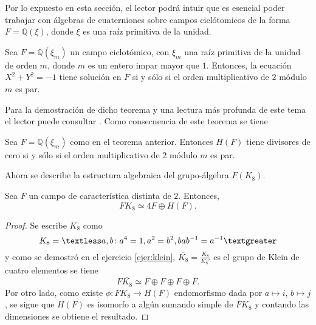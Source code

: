 Por lo expuesto en esta sección, el lector podrá intuir que es esencial poder trabajar con álgebras de cuaterniones sobre campos ciclótomicos de la forma $F = \mathds{Q}(\xi)$, donde $\xi$ es una raíz primitiva de la unidad. 

\begin{teorema}
Sea $F = \mathds{Q}(\xi_m)$ un campo ciclotómico, con $\xi_m$ una raíz primitiva de la unidad de orden $m$, donde $m$ es un entero impar mayor que $1$. Entonces, la ecuación $X^2 + Y^2 = -1$ tiene solución en $F$ si y sólo si el orden multiplicativo de $2$ módulo $m$ es par.
\end{teorema}

Para la demostración de dicho teorema y una lectura más profunda de este tema el lector puede consultar \cite{bib:moser}. Como consecuencia de este teorema se tiene
\begin{lema}
Sea $F = \mathds{Q}(\xi_m)$ como en el teorema anterior. Entonces $H(F)$ tiene divisores de cero si y sólo si el orden multiplicativo de $2$ módulo $m$ es par.
\end{lema}

Ahora se describe la estructura algebraica del grupo-álgebra $F(K_8)$.

\begin{lema}\label{lem:K8}
Sea $F$ un campo de característica distinta de $2 $. Entonces,
\begin{equation*}
FK_8 \simeq 4F\oplus H(F).
\end{equation*}
\end{lema}
\begin{proof}
Se escribe $K_8$ como
\begin{equation*}
K_8 = \textless a, b \colon a^4 = 1, a^2 = b^2, bab^{-1} = a^{-1} \textgreater
\end{equation*}
y como se demostró en el ejercicio \ref{ejer:klein}, $\overline{K_8} = \frac{K_8}{K_8'}$ es el grupo de Klein de cuatro elementos se tiene
\begin{equation*}
F\overline{K_8} \simeq F \oplus F \oplus F \oplus F.
\end{equation*}
Por otro lado, como existe $\phi \colon FK_8 \to H(F)$ endomorfismo dada por $a \mapsto i$, $b \mapsto j$, se sigue que $H(F)$ es isomorfo a algún sumando simple de $FK_8$ y contando las dimensiones se obtiene el resultado. 
\end{proof}


